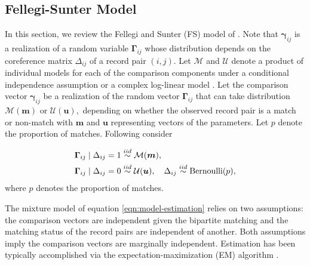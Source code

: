 \documentclass[ba]{imsart}
\newcommand{\bem}{\boldsymbol{m}}
\newcommand{\bu}{\boldsymbol{u}}
\newcommand{\bGamma}{\boldsymbol{\Gamma}}
\newcommand{\bgamma}{\boldsymbol{\gamma}}
\begin{document}
\subsection{Fellegi-Sunter Model}
\label{sec:fellegi-sunter-model}
In this section, we review the Fellegi and Sunter (FS) model of \cite{fellegi_theory_1969}.
Note that $\bgamma_{ij}$ is a realization of a random variable $\bGamma_{ij}$ whose distribution depends on the coreference matrix $\Delta_{ij}$ of a record pair $(i,j).$ Let $\mathcal{M}$ and $\mathcal{U}$ denote a product of individual models for each of the comparison components under a conditional independence assumption \citep{Winkler1988, jaro_1989} or a complex log-linear model \citep{larsen_2001}. 
Let the comparison vector $\bgamma_{ij}$ be a realization of the random vector $\bGamma_{ij}$ that can take distribution 
$\mathcal{M}(\bem)$ or $\mathcal{U}(\bu),$ depending on whether the observed record pair is a match or non-match with 
$\bem$ and $\bu$ representing vectors of the parameters. Let $p$ denote the proportion of matches. 
Following \cite{Winkler1988, jaro_1989, larsen_2001} consider

\begin{align}
\label{eqn:model-estimation}
\bGamma_{ij} \mid \Delta_{ij} = 1 &\stackrel{iid}{\sim} \mathcal{M}(\bem), \notag \\
\bGamma_{ij} \mid \Delta_{ij} = 0 &\stackrel{iid}{\sim} \mathcal{U}(\bu), \quad \Delta_{ij} \stackrel{iid}{\sim} \text{Bernoulli}(p),
\end{align}
where $p$ denotes the proportion of matches.

The mixture model of equation \ref{eqn:model-estimation} relies on two assumptions: the comparison vectors are independent given the bipartite matching and the matching status of the record pairs are independent of another. Both assumptions imply the comparison vectors are marginally independent. Estimation has been typically accomplished via the expectation-maximization (EM) algorithm \citep{dempster1977maximum}. 
\end{document}
